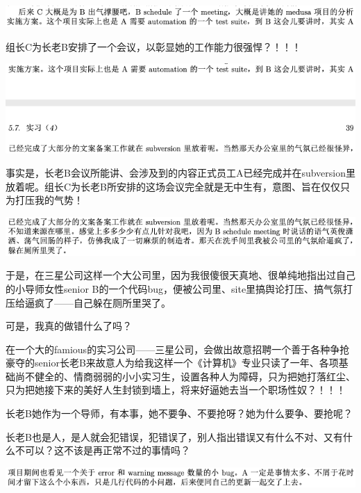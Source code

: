 \documentclass[9pt, b5paper]{article}
\begin{document}
\begin{center}
\includegraphics[width=.9\linewidth]{./pic/backups_plans_20210505_131253.png}
\end{center}

组长C为长老B安排了一个会议，以彰显她的工作能力很强悍？！！！

\begin{center}
\includegraphics[width=.9\linewidth]{./pic/backups_plans_20210505_131636.png}
\end{center}

事实是，长老B会议所能讲、会涉及到的内容正式员工A已经完成并在subversion里放着呢。组长C为长老B所安排的这场会议完全就是无中生有，意图、旨在仅仅只为打压我的气势！

\begin{center}
\includegraphics[width=.9\linewidth]{./pic/backups_plans_20210504_231406.png}
\end{center}

于是，在三星公司这样一个大公司里，因为我很傻很天真地、很单纯地指出过自己的小导师女性senior B的一个代码bug，便被公司里、site里搞舆论打压、搞气氛打压给逼疯了——自己躲在厕所里哭了。 

可是，我真的做错什么了吗？

在一个大的famious的实习公司——三星公司，会做出故意招聘一个善于各种争抢豪夺的senior长老B来故意人为给我这样一个《计算机》专业只读了一年、各项基础尚不健全的、情商弱弱的小小实习生，设置各种人为障碍，只为把她打落红尘、只为把她接下来的美好人生封锁到墙上，将来好逼她去当一个职场性奴？！！！

长老B她作为一个导师，有本事，她不要争、不要抢呀？她为什么要争、要抢呢？

长老B也是人，是人就会犯错误，犯错误了，别人指出错误又有什么不对、又有什么不可以？这不该是再正常不过的事情吗？

\begin{center}
\includegraphics[width=.9\linewidth]{./pic/readme_20210505_141145.png}
\end{center}
\end{document}
